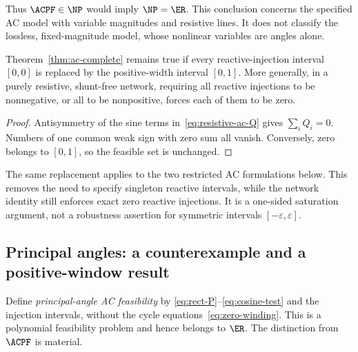 Thus $\ACPF\in\NP$ would imply $\NP=\ER$. This conclusion concerns the
specified AC model with variable magnitudes and resistive lines. It does not
classify the lossless, fixed-magnitude model, whose nonlinear variables are
angles alone.

\begin{corollary}
\label{cor:one-sided-reactive}
Theorem~\ref{thm:ac-complete} remains true if every reactive-injection
interval $[0,0]$ is replaced by the positive-width interval $[0,1]$.
More generally, in a purely resistive, shunt-free network, requiring all
reactive injections to be nonnegative, or all to be nonpositive, forces
each of them to be zero.
\end{corollary}
\begin{proof}
Antisymmetry of the sine terms in~\eqref{eq:resistive-ac-Q} gives
$\sum_i Q_i=0$. Numbers of one common weak sign with zero sum all vanish.
Conversely, zero belongs to $[0,1]$, so the feasible set is unchanged.
\end{proof}

The same replacement applies to the two restricted AC formulations below.
This removes the need to specify singleton reactive intervals, while the
network identity still enforces exact zero reactive injections. It is a
one-sided saturation argument, not a robustness assertion for symmetric
intervals $[-\varepsilon,\varepsilon]$.

\subsection{Principal angles: a counterexample and a positive-window result}
\label{subsec:principal}

Define \emph{principal-angle AC feasibility} by
\eqref{eq:rect-P}--\eqref{eq:cosine-test} and the injection intervals, without
the cycle equations~\eqref{eq:zero-winding}. This is a polynomial feasibility
problem and hence belongs to $\ER$. The distinction from $\ACPF$ is material.

